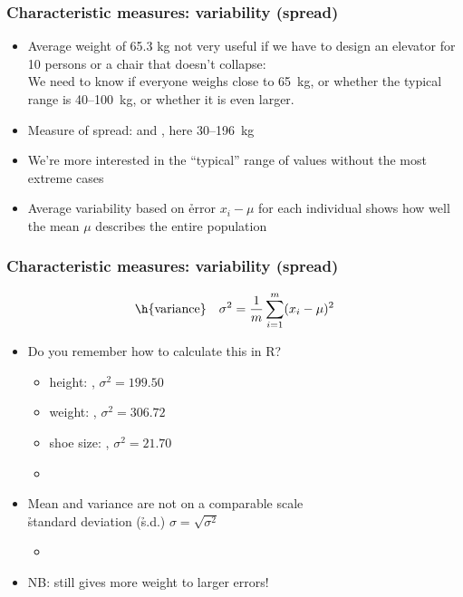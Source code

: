 \documentclass[t]{beamer} %
\begin{document}
\begin{frame}
  \frametitle{Characteristic measures: variability (spread)}

  \begin{itemize}
  \item Average weight of 65.3 kg not very useful if we have to design an
    elevator for 10 persons or a chair that doesn't collapse:\\
    We need to know if everyone weighs close to 65~kg, or whether the typical
    range is 40--100~kg, or whether it is even larger.
  \item Measure of spread:  and , here 30--196~kg
  \item We're more interested in the ``typical'' range of values without the
    most extreme cases
  \item Average variability based on \h{error} $x_i - \mu$ for each individual
    shows how well the mean $\mu$ describes the entire population
  \end{itemize}

\end{frame}

\begin{frame}
  \frametitle{Characteristic measures: variability (spread)}

  \[
  \text{\h{variance}}\quad
  \sigma^2 = \frac{1}{m} \sum_{i=1}^m (x_i - \mu)^2
  \]
  \begin{itemize}
  \item[\hand] Do you remember how to calculate this in R?
    \begin{itemize}
    \item<2-> height: , $\sigma^2 = 199.50$%
    \item<2-> weight: , $\sigma^2 = 306.72$%
    \item<2-> shoe size: , $\sigma^2 = 21.70$%
    \item[]
    \end{itemize}
  \item<3-> Mean and variance are not on a comparable scale\\
    \so \h{standard deviation} (\h{s.d.}) $\sigma = \sqrt{\sigma^2}$
    \begin{itemize}
    \item[]
    \end{itemize}
  \item<3-> NB: still gives more weight to larger errors!
  \end{itemize}
\end{frame}
\end{document}
